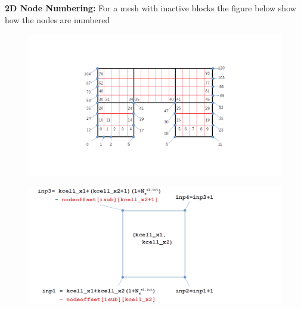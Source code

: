 \documentclass[a4paper,12pt]{article}
\begin{document}
\noindent\textbf{2D Node Numbering:} For a mesh with inactive blocks the figure below show how the nodes are numbered
\begin{figure}[H]
	\centering
	\includegraphics[trim=140 100 200 100,clip,scale=0.35]{figures/InactiveMesh_NodeNumbered.png}		
\end{figure} 

\begin{figure}[H]
	\centering
	\includegraphics[scale=0.35]{figures/InactiveMeshNodeIDCalc.png}	
\end{figure}
\end{document}
